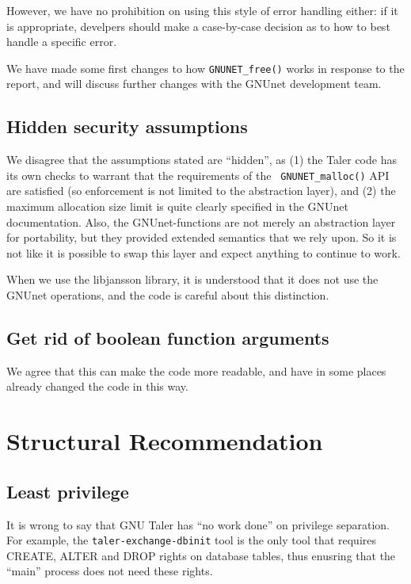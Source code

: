 \documentclass[11pt]{article}
\begin{document}
However, we have no prohibition on using this style of error handling either:
if it is appropriate, develpers should make a case-by-case decision as to how
to best handle a specific error.

We have made some first changes to how {\tt GNUNET\_free()} works in response
to the report, and will discuss further changes with the GNUnet development
team.

\subsection{Hidden security assumptions}

We disagree that the assumptions stated are ``hidden'', as (1) the Taler code
has its own checks to warrant that the requirements of the {\tt
  GNUNET\_malloc()} API are satisfied (so enforcement is not limited to the
abstraction layer), and (2) the maximum allocation size limit is quite clearly
specified in the GNUnet documentation.  Also, the GNUnet-functions are not
merely an abstraction layer for portability, but they provided extended
semantics that we rely upon. So it is not like it is possible to swap this
layer and expect anything to continue to work.

When we use the libjansson library, it is understood that it does not use
the GNUnet operations, and the code is careful about this distinction.

\subsection{Get rid of boolean function arguments}

We agree that this can make the code more readable, and have in some places
already changed the code in this way.

\section{Structural Recommendation}

\subsection{Least privilege}

It is wrong to say that GNU Taler has ``no work done'' on privilege separation.
For example, the {\tt taler-exchange-dbinit} tool is the only tool that requires
CREATE, ALTER and DROP rights on database tables, thus enusring that the ``main''
process does not need these rights.
\end{document}
